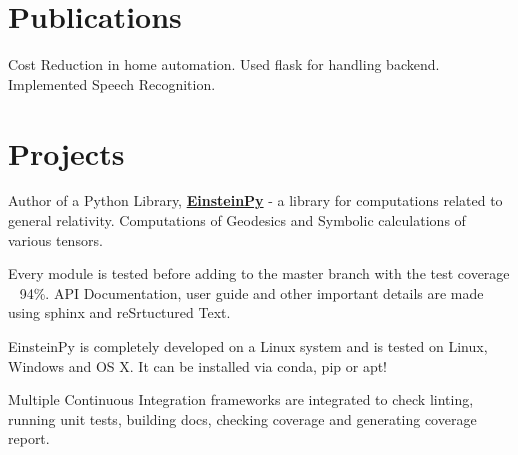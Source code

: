 \documentclass[a4paper]{deedy-resume-openfont}
\begin{document}
\begin{minipage}[t]{0.66\textwidth}
\section{Publications}

Cost Reduction in home automation. Used flask for handling backend. Implemented Speech Recognition.  


\section{Projects}

\begin{tightemize}
\item Author of a Python Library, \textbf{\href{http://github.com/einsteinpy/einsteinpy}{EinsteinPy}} - a library for computations related to general relativity. Computations of Geodesics and Symbolic calculations of various tensors.
\item Every module is tested before adding to the master branch with the test coverage ~ 94\%.  API Documentation, user guide and other important details are made using sphinx and reSrtuctured Text. 
\item EinsteinPy is completely developed on a Linux system and is tested on Linux, Windows and OS X.  It can be installed via conda, pip or apt!
\item Multiple Continuous Integration frameworks are integrated to check linting, running unit tests, building docs,  checking coverage  and generating coverage report.
\end{tightemize}
\sectionsep


\end{minipage}
\end{document}
